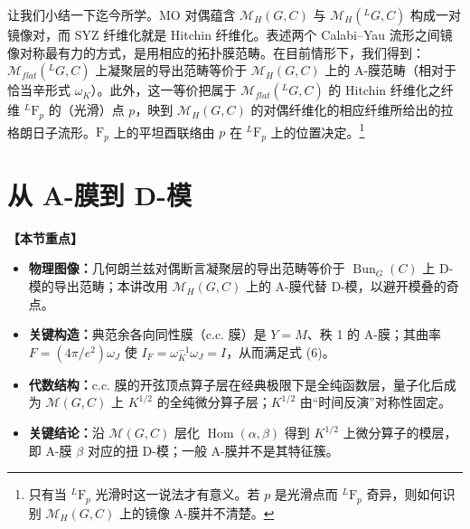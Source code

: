 \documentclass[11pt,a4paper,UTF8]{ctexart}
\newenvironment{keypoints}{%
  \par\addvspace{0.9em}%
  \noindent{\color{black!80}\rule{\linewidth}{0.6pt}}\par\nopagebreak\vspace{2pt}%
  \noindent\textbf{【本节重点】}\par\nopagebreak\vspace{2pt}%
  \begin{itemize}[leftmargin=1.6em,itemsep=1pt,topsep=2pt,parsep=0pt]%
}{%
  \end{itemize}\vspace{1pt}\noindent{\color{black!80}\rule{\linewidth}{0.6pt}}\par\addvspace{0.9em}%
}
\begin{document}
让我们小结一下迄今所学。MO 对偶蕴含 $\mathcal{M}_{H}(G,C)$ 与 $\mathcal{M}_{H}({}^{L}G,C)$ 构成一对镜像对，而 SYZ 纤维化就是 Hitchin 纤维化。表述两个 Calabi–Yau 流形之间镜像对称最有力的方式，是用相应的拓扑膜范畴。在目前情形下，我们得到：$\mathcal{M}_{flat}({}^{L}G,C)$ 上凝聚层的导出范畴等价于 $\mathcal{M}_{H}(G,C)$ 上的 A-膜范畴（相对于恰当辛形式 $\omega_{K}$）。此外，这一等价把属于 $\mathcal{M}_{flat}({}^{L}G,C)$ 的 Hitchin 纤维化之纤维 ${}^{L}\mathrm{F}_{p}$ 的（光滑）点 $p$，映到 $\mathcal{M}_{H}(G,C)$ 的对偶纤维化的相应纤维所给出的拉格朗日子流形。$\mathrm{F}_{p}$ 上的平坦酉联络由 $p$ 在 ${}^{L}\mathrm{F}_{p}$ 上的位置决定。\footnote{只有当 ${}^{L}\mathrm{F}_{p}$ 光滑时这一说法才有意义。若 $p$ 是光滑点而 ${}^{L}\mathrm{F}_{p}$ 奇异，则如何识别 $\mathcal{M}_{H}(G,C)$ 上的镜像 A-膜并不清楚。}



\section{从 A-膜到 D-模}

\begin{keypoints}
    \item \textbf{物理图像：}几何朗兰兹对偶断言凝聚层的导出范畴等价于 $\operatorname{Bun}_{G}(C)$ 上 D-模的导出范畴；本讲改用 $\mathcal{M}_{H}(G,C)$ 上的 A-膜代替 D-模，以避开模叠的奇点。
    \item \textbf{关键构造：}典范余各向同性膜（c.c. 膜）是 $Y=M$、秩 1 的 A-膜；其曲率 $F=(4\pi/e^{2})\omega_{J}$ 使 $I_{F}=\omega_{K}^{-1}\omega_{J}=I$，从而满足式 (6)。
    \item \textbf{代数结构：}c.c. 膜的开弦顶点算子层在经典极限下是全纯函数层，量子化后成为 $\mathcal{M}(G,C)$ 上 $K^{1/2}$ 的全纯微分算子层；$K^{1/2}$ 由“时间反演”对称性固定。
    \item \textbf{关键结论：}沿 $\mathcal{M}(G,C)$ 层化 $\operatorname{Hom}(\alpha,\beta)$ 得到 $K^{1/2}$ 上微分算子的模层，即 A-膜 $\beta$ 对应的扭 D-模；一般 A-膜并不是其特征簇。
\end{keypoints}
\end{document}
